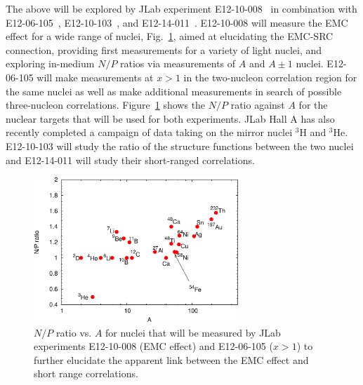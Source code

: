The above will be explored by JLab experiment E12-10-008~\cite{12gev_emc} in combination
with E12-06-105~\cite{12gev_xgt1}, E12-10-103~\cite{mar}, and E12-14-011~\cite{tritsrc}. E12-10-008 will measure the EMC effect for a wide range of nuclei, Fig.~\ref{fig:np_ratios},
aimed at elucidating the EMC-SRC connection, providing first measurements for a variety of light nuclei,
and exploring in-medium $N/P$ ratios via measurements of $A$ and $A\pm1$ nuclei.  E12-06-105 will make
measurements at $x>1$ in the two-nucleon correlation region for the same nuclei as well as make additional
measurements in search of possible three-nucleon correlations. Figure~\ref{fig:np_ratios} shows the $N/P$
ratio against $A$ for the nuclear targets that will be used for both experiments.%
JLab Hall A has also recently completed a campaign of data taking on the mirror nuclei $^3$H and $^3$He. 
E12-10-103 will study the ratio of the structure functions between the two nuclei and 
E12-14-011 will study their short-ranged correlations.

\begin{figure}[tbp]
\includegraphics[width=\columnwidth,height=55mm]{plots/np_ratios_2017-crop.pdf}
\caption{$N/P$ ratio vs. $A$ for nuclei that will be measured by JLab experiments E12-10-008 (EMC effect) and E12-06-105 ($x>1$) to further elucidate the apparent link between the EMC effect and short range  correlations.}
\label{fig:np_ratios}
\end{figure}
